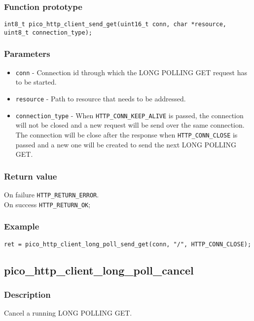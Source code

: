 \subsubsection*{Function prototype}
\texttt{int8\_t pico\_http\_client\_send\_get(uint16\_t conn, char *resource, uint8\_t connection\_type);}

\subsubsection*{Parameters}

\begin{itemize}[noitemsep]
\item \texttt{conn} - Connection id through which the LONG POLLING GET request has to be started.
\item \texttt{resource} - Path to resource that needs to be addressed.
\item \texttt{connection\_type} - When \texttt{HTTP\_CONN\_KEEP\_ALIVE} is passed, the connection will not be closed and a new request will be send over the same connection. The connection will be close after the response when \texttt{HTTP\_CONN\_CLOSE} is passed and a new one will be created to send the next LONG POLLING GET.
\end{itemize}
\subsubsection*{Return value}
On failure \texttt{HTTP\_RETURN\_ERROR}.
\\On success \texttt{HTTP\_RETURN\_OK};
\subsubsection*{Example}
\begin{verbatim}
ret = pico_http_client_long_poll_send_get(conn, "/", HTTP_CONN_CLOSE);
\end{verbatim}


\subsection{pico\_http\_client\_long\_poll\_cancel}

\subsubsection*{Description}
Cancel a running LONG POLLING GET.

